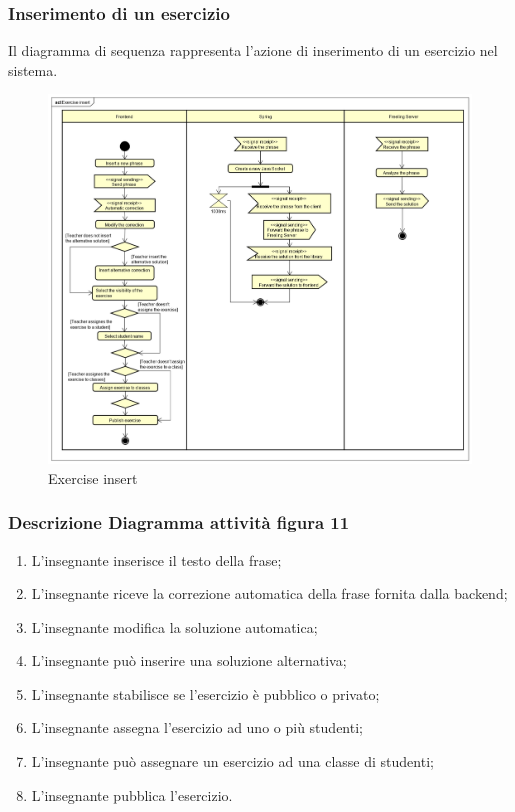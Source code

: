 \subsubsection{Inserimento di un esercizio}
Il diagramma di sequenza rappresenta l'azione di inserimento di un esercizio nel sistema.
\begin{figure}[H]
\centering
\includegraphics[width=17cm, keepaspectratio]{img/Exercise-insert.png} 
\caption{Exercise insert}
\end{figure}
\subsubsection{Descrizione Diagramma attività figura 11}
\begin{enumerate}
        \item L'insegnante inserisce il testo della frase;
        \item L'insegnante riceve la correzione automatica della frase fornita dalla backend;
        \item L'insegnante modifica la soluzione automatica;
        \item L'insegnante può inserire una soluzione alternativa;
        \item L'insegnante stabilisce se l'esercizio è pubblico o privato;
        \item L'insegnante assegna l'esercizio ad uno o più studenti;
        \item L'insegnante può assegnare un esercizio ad una classe di studenti;
        \item L'insegnante pubblica l'esercizio.
    \end{enumerate}

